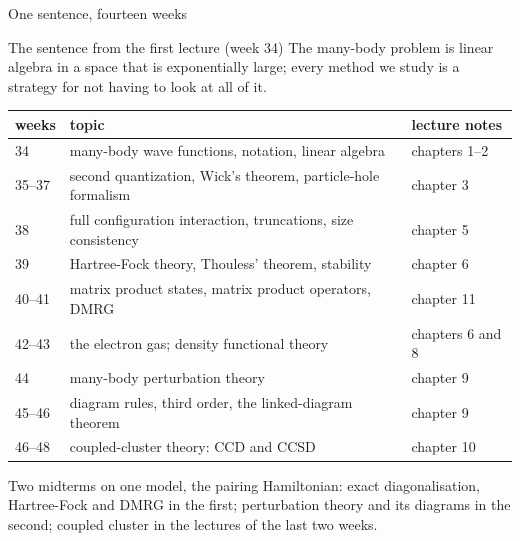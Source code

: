 \documentclass[aspectratio=169,10pt]{beamer}
\begin{document}
\begin{frame}[shrink=13]{One sentence, fourteen weeks}
\begin{exampleblock}{The sentence from the first lecture (week 34)}
The many-body problem is linear algebra in a space that is exponentially large; every method we study is a strategy for not having to look at all of it.
\end{exampleblock}
\small
\begin{center}
\renewcommand{\arraystretch}{1.12}
\begin{tabular}{lll}
\toprule
weeks & topic & lecture notes\\
\midrule
34 & many-body wave functions, notation, linear algebra & chapters 1--2\\
35--37 & second quantization, Wick's theorem, particle-hole formalism & chapter 3\\
38 & full configuration interaction, truncations, size consistency & chapter 5\\
39 & Hartree-Fock theory, Thouless' theorem, stability & chapter 6\\
40--41 & matrix product states, matrix product operators, DMRG & chapter 11\\
42--43 & the electron gas; density functional theory & chapters 6 and 8\\
44 & many-body perturbation theory & chapter 9\\
45--46 & diagram rules, third order, the linked-diagram theorem & chapter 9\\
46--48 & coupled-cluster theory: CCD and CCSD & chapter 10\\
\bottomrule
\end{tabular}
\end{center}
Two midterms on one model, the pairing Hamiltonian: exact diagonalisation, Hartree-Fock and DMRG in the first; perturbation theory and its diagrams in the second; coupled cluster in the lectures of the last two weeks.
\end{frame}
\end{document}
